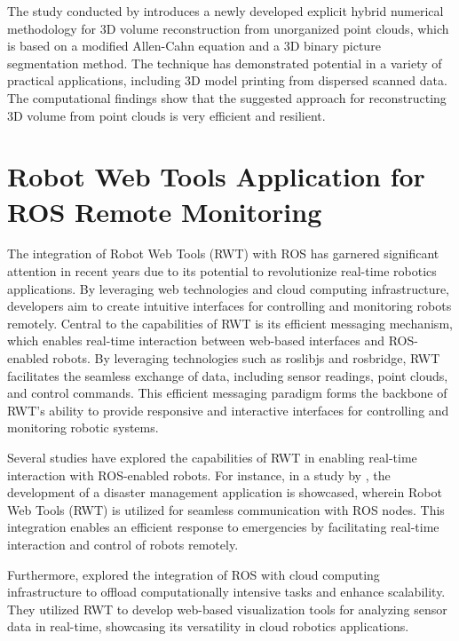 The study conducted by \citet{jeong2018} introduces a newly developed explicit hybrid numerical methodology for 3D volume reconstruction from unorganized point clouds, which is based on a modified Allen-Cahn equation and a 3D binary picture segmentation method. The technique has demonstrated potential in a variety of practical applications, including 3D model printing from dispersed scanned data. The computational findings show that the suggested approach for reconstructing 3D volume from point clouds is very efficient and resilient.

\section{Robot Web Tools Application for ROS Remote Monitoring}

The integration of Robot Web Tools (RWT) with ROS has garnered significant attention in recent years due to its potential to revolutionize real-time robotics applications. By leveraging web technologies and cloud computing infrastructure, developers aim to create intuitive interfaces for controlling and monitoring robots remotely. Central to the capabilities of RWT is its efficient messaging mechanism, which enables real-time interaction between web-based interfaces and ROS-enabled robots. By leveraging technologies such as roslibjs and rosbridge, RWT facilitates the seamless exchange of data, including sensor readings, point clouds, and control commands. This efficient messaging paradigm forms the backbone of RWT's ability to provide responsive and interactive interfaces for controlling and monitoring robotic systems.

Several studies have explored the capabilities of RWT in enabling real-time interaction with ROS-enabled robots. For instance, in a study by \citet{qureshi2016poster}, the development of a disaster management application is showcased, wherein Robot Web Tools (RWT) is utilized for seamless communication with ROS nodes. This integration enables an efficient response to emergencies by facilitating real-time interaction and control of robots remotely.

Furthermore, \citet{lim2019cloud} explored the integration of ROS with cloud computing infrastructure to offload computationally intensive tasks and enhance scalability. They utilized RWT to develop web-based visualization tools for analyzing sensor data in real-time, showcasing its versatility in cloud robotics applications.



